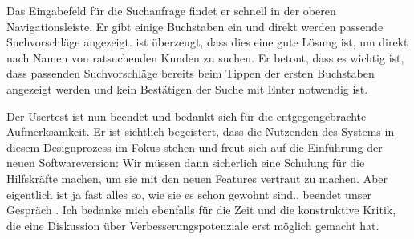 Das Eingabefeld für die Suchanfrage findet er schnell in der oberen
Navigationsleiste. Er gibt einige Buchstaben ein und direkt werden passende
Suchvorschläge angezeigt. \ipName ist überzeugt, dass dies eine gute Lösung
ist, um direkt nach Namen von ratsuchenden Kunden zu suchen. Er betont, dass es
wichtig ist, dass passenden Suchvorschläge bereits beim Tippen der ersten
Buchstaben angezeigt werden und kein Bestätigen der Suche mit Enter notwendig
ist.

Der Usertest ist nun beendet und \ipName bedankt sich für die entgegengebrachte
Aufmerksamkeit. Er ist sichtlich begeistert, dass die Nutzenden des Systems in
diesem Designprozess im Fokus stehen und freut sich auf die Einführung der
neuen Softwareversion: \glqq{}Wir müssen dann sicherlich eine Schulung für die
Hilfskräfte machen, um sie mit den neuen Features vertraut zu machen. Aber
eigentlich ist ja fast alles so, wie sie es schon gewohnt sind.\grqq{}, beendet
\ipName unser Gespräch \cite{clavesUsertest}. Ich bedanke mich ebenfalls für die Zeit und die
konstruktive Kritik, die eine Diskussion über Verbesserungspotenziale erst
möglich gemacht hat.